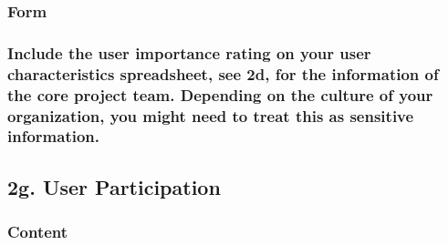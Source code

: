 \documentclass[
]{article}
\begin{document}
\hypertarget{form-7}{%
\subsubsection{Form}\label{form-7}}

\hypertarget{include-the-user-importance-rating-on-your-user-characteristics-spreadsheet-see-2d-for-the-information-of-the-core-project-team.-depending-on-the-culture-of-your-organization-you-might-need-to-treat-this-as-sensitive-information.}{%
\subsubsection{Include the user importance rating on your user
characteristics spreadsheet, see 2d, for the information of the core
project team. Depending on the culture of your organization, you might
need to treat this as sensitive
information.}\label{include-the-user-importance-rating-on-your-user-characteristics-spreadsheet-see-2d-for-the-information-of-the-core-project-team.-depending-on-the-culture-of-your-organization-you-might-need-to-treat-this-as-sensitive-information.}}

\hypertarget{g.-user-participation}{%
\subsection{2g. User Participation}\label{g.-user-participation}}

\hypertarget{content-8}{%
\subsubsection{Content}\label{content-8}}
\end{document}
